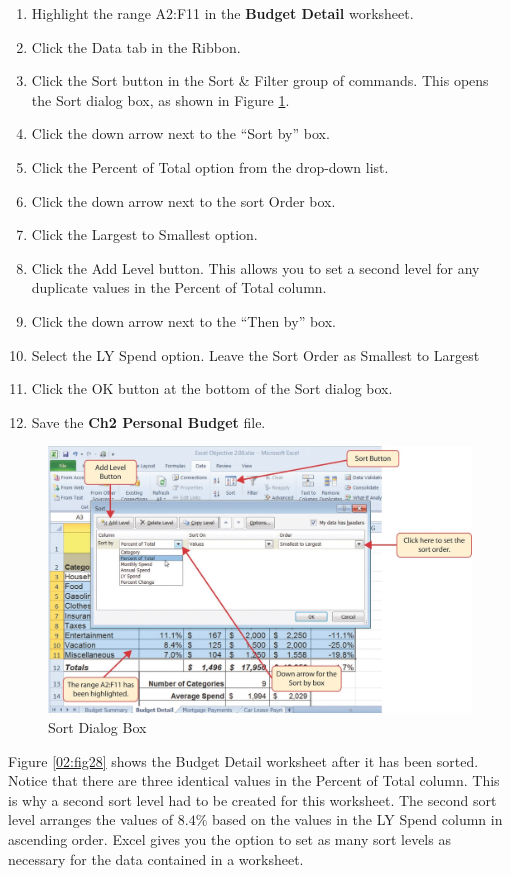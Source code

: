\begin{enumerate}
	\item Highlight the range \textsf{A2:F11} in the \textbf{Budget Detail} worksheet.
	\item Click the Data tab in the Ribbon.
	\item Click the Sort button in the Sort \& Filter group of commands. This opens the Sort dialog box, as shown in Figure \ref{02:fig27}.
	\item Click the down arrow next to the ``Sort by'' box.
	\item Click the Percent of Total option from the drop-down list.
	\item Click the down arrow next to the sort Order box.
	\item Click the Largest to Smallest option.
	\item Click the Add Level button. This allows you to set a second level for any duplicate values in the Percent of Total column.
	\item Click the down arrow next to the ``Then by'' box.
	\item Select the LY Spend option. Leave the Sort Order as Smallest to Largest
	\item Click the OK button at the bottom of the Sort dialog box.
	\item Save the \textbf{Ch2 Personal Budget} file.
\end{enumerate}

\begin{figure}[H]
	\centering
	\includegraphics[width=\maxwidth{.95\linewidth}]{gfx/ch02_fig27}
	\caption{Sort Dialog Box}
	\label{02:fig27}
\end{figure}

Figure \ref{02:fig28} shows the Budget Detail worksheet after it has been sorted. Notice that there are three identical values in the Percent of Total column. This is why a second sort level had to be created for this worksheet. The second sort level arranges the values of $ 8.4\% $ based on the values in the LY Spend column in ascending order. Excel gives you the option to set as many sort levels as necessary for the data contained in a worksheet.


